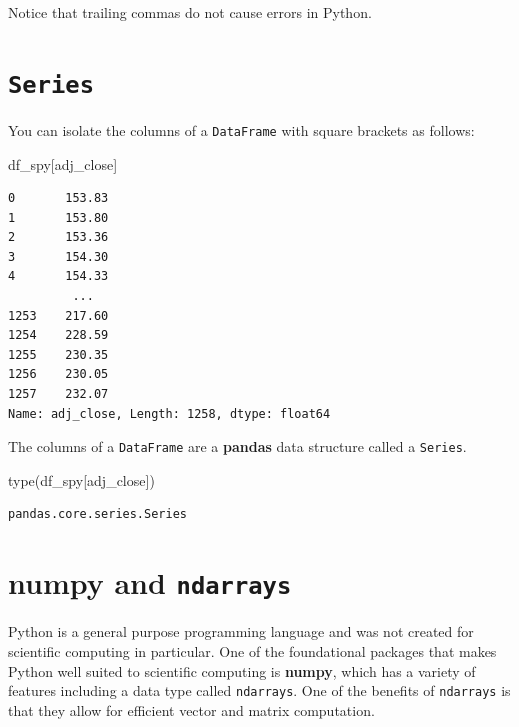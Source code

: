 \documentclass[
  letterpaper,
  DIV=11,
  numbers=noendperiod]{scrreprt}
\newenvironment{Shaded}{\begin{snugshade}}{\end{snugshade}}
\newcommand{\BuiltInTok}[1]{\textcolor[rgb]{0.00,0.23,0.31}{#1}}
\newcommand{\NormalTok}[1]{\textcolor[rgb]{0.00,0.23,0.31}{#1}}
\newcommand{\StringTok}[1]{\textcolor[rgb]{0.13,0.47,0.30}{#1}}
\begin{document}
Notice that trailing commas do not cause errors in Python.

\hypertarget{series}{%
\section{\texorpdfstring{\texttt{Series}}{Series}}\label{series}}

You can isolate the columns of a \texttt{DataFrame} with square brackets
as follows:

\begin{Shaded}
\begin{Highlighting}[]
\NormalTok{df\_spy[}\StringTok{\textquotesingle{}adj\_close\textquotesingle{}}\NormalTok{]}
\end{Highlighting}
\end{Shaded}

\begin{verbatim}
0       153.83
1       153.80
2       153.36
3       154.30
4       154.33
         ...  
1253    217.60
1254    228.59
1255    230.35
1256    230.05
1257    232.07
Name: adj_close, Length: 1258, dtype: float64
\end{verbatim}

The columns of a \texttt{DataFrame} are a \textbf{pandas} data structure
called a \texttt{Series}.

\begin{Shaded}
\begin{Highlighting}[]
\BuiltInTok{type}\NormalTok{(df\_spy[}\StringTok{\textquotesingle{}adj\_close\textquotesingle{}}\NormalTok{])}
\end{Highlighting}
\end{Shaded}

\begin{verbatim}
pandas.core.series.Series
\end{verbatim}

\hypertarget{numpy-and-ndarrays}{%
\section{\texorpdfstring{\textbf{numpy} and
\texttt{ndarrays}}{numpy and ndarrays}}\label{numpy-and-ndarrays}}

Python is a general purpose programming language and was not created for
scientific computing in particular. One of the foundational packages
that makes Python well suited to scientific computing is \textbf{numpy},
which has a variety of features including a data type called
\texttt{ndarrays}. One of the benefits of \texttt{ndarrays} is that they
allow for efficient vector and matrix computation.
\end{document}
